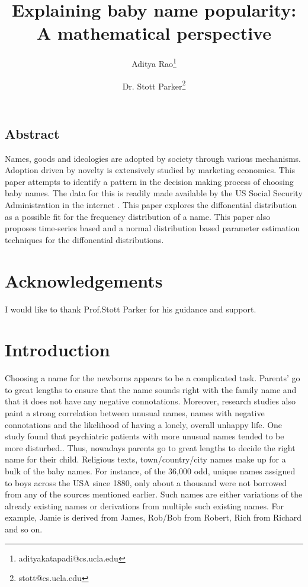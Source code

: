 \documentclass[letterpaper,12pt]{article}
\begin{document}
\date{}

\title{\Large \bf Explaining baby name popularity: A mathematical perspective}

\author[1]{Aditya Rao\thanks{adityakatapadi@cs.ucla.edu}}
\author[2]{Dr. Stott Parker\thanks{stott@cs.ucla.edu}}
\maketitle

\thispagestyle{empty}

\pagebreak
\subsection*{Abstract}
Names, goods and ideologies are adopted by society through various mechanisms. Adoption driven by novelty is extensively studied by marketing economics\cite{3}. This paper attempts to identify a pattern in the decision making process of choosing baby names. The data for this is readily made available by the US Social Security Administration in the internet \cite{4}. This paper explores the diffonential distribution \cite{6} as a possible fit for the frequency distribution of a name. This paper also proposes time-series based and a normal distribution based parameter estimation techniques for the diffonential distributions. 

\section*{Acknowledgements}
I would like to thank Prof.Stott Parker for his guidance and support.
\pagebreak

\section{Introduction}
Choosing a name for the newborns appears to be a complicated task. Parents' go to great lengths to ensure that the name sounds right with the family name and that it does not have any negative connotations. Moreover, research studies also paint a strong correlation between unusual names, names with negative connotations and the likelihood of having a lonely, overall unhappy life. One study found that psychiatric patients with more unusual names tended to be more disturbed.\cite{5}. Thus, nowadays parents go to great lengths to decide the right name for their child.
Religious texts, town/country/city names make up for a bulk of the baby names. For instance, of the 36,000 odd, unique names assigned to boys across the USA since 1880, only about a thousand were not borrowed from any of the sources mentioned earlier. Such names are either variations of the already existing names or derivations from multiple such existing names. For example, Jamie is derived from James, Rob/Bob from Robert, Rich from Richard and so on. 
\end{document}

